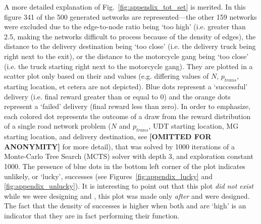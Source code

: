 A more detailed explanation of Fig.~\ref{fig:appendix_tot_set} is merited. In this figure 341 of the 500 generated networks are represented---the other 159 networks were excluded due to the edge-to-node ratio being `too high' (i.e. greater than 2.5, making the networks difficult to process because of the density of edges), the distance to the delivery destination being `too close' (i.e. the delivery truck being right next to the exit), or the distance to the motorcycle gang being `too  close' (i.e. the truck starting right next to the motorcycle gang). They are plotted in a scatter plot only based on their \xQ{} and \xO{} values (e.g. differing values of $N$, $p_{trans}$, starting location, et cetera are not depicted). Blue dots represent a `successful' delivery (i.e. final reward greater than or equal to 0) and the orange dots represent a `failed' delivery (final reward less than zero). In order to emphasize, each colored dot represents the outcome of a draw from the \pri{} reward distribution of a single road network problem ($N$ and $p_{trans}$, UDT starting location, MG starting location, and delivery destination, see \textbf{[OMITTED FOR ANONYMITY]} for more detail), that was solved by 1000 iterations of a Monte-Carlo Tree Search (MCTS) solver with depth 3, and exploration constant 1000. The presence of blue dots in the bottom left corner of the plot indicates unlikely, or `lucky', successes (see Figures~\ref{fig:appendix_lucky} and \ref{fig:appendix_unlucky}). It is interesting to point out that this plot \emph{did not exist} while we were designing \xQ{} and \xO{}, this plot was made only \emph{after} \xQ{} and \xO{} were designed. The fact that the density of successes is higher when both \xQ{} and \xO{} are `high' is an indicator that they are in fact performing their function.


